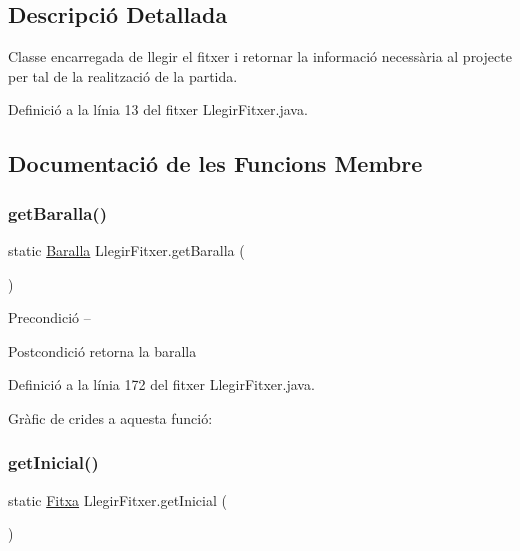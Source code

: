 \subsection{Descripció Detallada}
Classe encarregada de llegir el fitxer i retornar la informació necessària al projecte per tal de la realització de la partida. 

Definició a la línia 13 del fitxer Llegir\+Fitxer.\+java.



\subsection{Documentació de les Funcions Membre}
\mbox{\label{class_llegir_fitxer_a931dfb14e0ddc1fd9b3db85d085ebceb}} 
\subsubsection{\texorpdfstring{get\+Baralla()}{getBaralla()}}
{\footnotesize\ttfamily static \mbox{\hyperlink{class_baralla}{Baralla}} Llegir\+Fitxer.\+get\+Baralla (\begin{DoxyParamCaption}{ }\end{DoxyParamCaption})\hspace{0.3cm}{\ttfamily [static]}}

\begin{DoxyPrecond}{Precondició}
-- 
\end{DoxyPrecond}
\begin{DoxyPostcond}{Postcondició}
retorna la baralla 
\end{DoxyPostcond}


Definició a la línia 172 del fitxer Llegir\+Fitxer.\+java.

Gràfic de crides a aquesta funció\+:
\mbox{\label{class_llegir_fitxer_afce4c62bf6cf65bf2e719edee92b15b2}} 
\subsubsection{\texorpdfstring{get\+Inicial()}{getInicial()}}
{\footnotesize\ttfamily static \mbox{\hyperlink{class_fitxa}{Fitxa}} Llegir\+Fitxer.\+get\+Inicial (\begin{DoxyParamCaption}{ }\end{DoxyParamCaption})\hspace{0.3cm}{\ttfamily [static]}}

